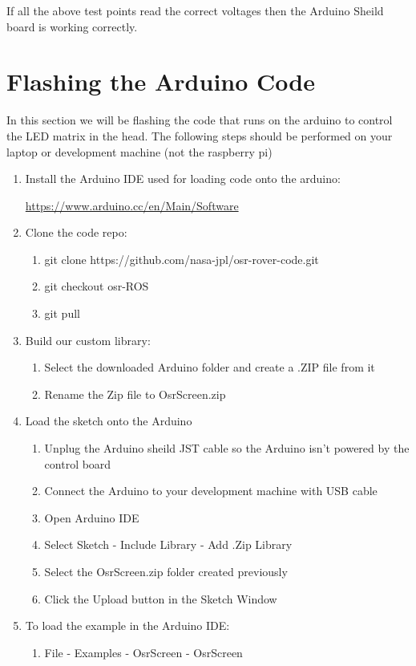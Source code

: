 \documentclass[12pt]{article}
\begin{document}
If all the above test points read the correct voltages then the Arduino Sheild board is working correctly. 

\section{Flashing the Arduino Code}

In this section we will be flashing the code that runs on the arduino to control the LED matrix in the head. The following steps should be performed on your laptop or development machine (not the raspberry pi)

\begin{enumerate} 
\item Install the Arduino IDE used for loading code onto the arduino:

	\href{https://www.arduino.cc/en/Main/Software}{https://www.arduino.cc/en/Main/Software}

\item Clone the code repo:
	\begin{enumerate}
	\item git clone https://github.com/nasa-jpl/osr-rover-code.git
	\item git checkout osr-ROS
	\item git pull
	\end{enumerate}

\item Build our custom library:
	\begin{enumerate}
	\item Select the downloaded Arduino folder and create a .ZIP file from it
	\item Rename the Zip file to OsrScreen.zip
	\end{enumerate}

\item Load the sketch onto the Arduino
	\begin{enumerate}
	\item Unplug the Arduino sheild JST cable so the Arduino isn't powered by the control board
	\item Connect the Arduino to your development machine with USB cable
	\item Open Arduino IDE
	\item Select Sketch - Include Library - Add .Zip Library 
	\item Select the OsrScreen.zip folder created previously
	\item Click the Upload button in the Sketch Window	
	\end{enumerate}

\item To load the example in the Arduino IDE: 
	\begin{enumerate}
	\item File - Examples - OsrScreen - OsrScreen 
	\end{enumerate}

\end{enumerate}
\end{document}
